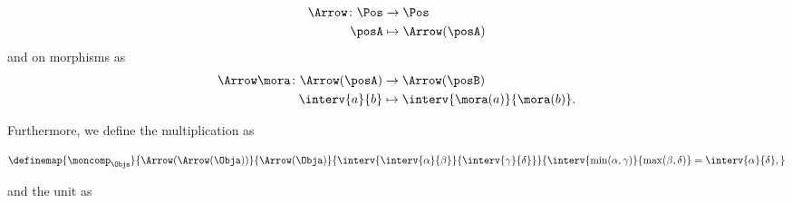 \begin{equation}
  \label{eq:monad-arrow-functor-objects}
  \begin{aligned}
    \Arrow\colon \Pos&\to \Pos\\
    \posA&\mapsto \Arrow(\posA)
  \end{aligned}
\end{equation}
and on morphisms as
\begin{equation}
  \label{eq:monad-arrow-functor-morphisms}
  \begin{aligned}
    \Arrow \mora\colon \Arrow(\posA)&\to \Arrow(\posB)\\
    \interv{a}{b}&\mapsto \interv{\mora(a)}{\mora(b)}.
  \end{aligned}
\end{equation}

Furthermore, we define the multiplication as

\begin{equation}\label{eq:monad-arrow-moncomp}
  \definemap{
    \moncomp_{\Obja}
  }{
    \Arrow (\Arrow(\Obja))
  }{
    \Arrow (\Obja)
  }{
    \interv{\interv{\alpha}{\beta}}{ \interv{\gamma}{ \delta}}
  }{
    \interv{\min(\alpha, \gamma)}{\max(\beta, \delta)} = \interv{\alpha}{\delta},
  }
\end{equation}

and the unit as

